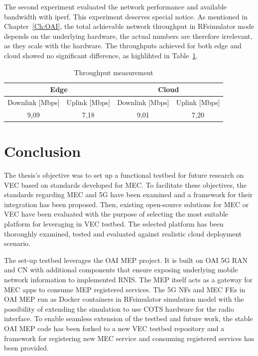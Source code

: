 \documentclass[12pt,a4paper,twoside]{report}
\begin{document}
The second experiment evaluated the network performance and available bandwidth with iperf. This experiment deserves special notice. As mentioned in Chapter~\ref{Ch:OAI}, the total achievable network throughput in RFsimulator mode depends on the underlying hardware, the actual numbers are therefore irrelevant, as they scale with the hardware. The throughputs achieved for both edge and cloud showed no significant difference, as highlihted in Table~\ref{T:throughput}.
\begin{table}[!ht]
    \centering
    \caption{Throughput measurement}
	\label{T:throughput}
    \begin{tabular}{|c|c|c|c|}
    \hline
        \multicolumn{2}{|c|}{Edge} & \multicolumn{2}{c|}{Cloud} \\ \hline
        Downlink [Mbps] & Uplink [Mbps] & Downlink [Mbps] & Uplink [Mbps] \\ \hline
        9,09 & 7,18 & 9,01 & 7,20 \\ \hline
    \end{tabular}
\end{table}
\chapter{Conclusion}
The thesis’s objective was to set up a functional testbed for future research on VEC based on standards developed for MEC. To facilitate these objectives, the standards regarding MEC and 5G have been examined and a framework for their integration has been proposed. Then, existing open-source solutions for MEC or VEC have been evaluated with the purpose of selecting the most suitable platform for leveraging in VEC testbed. The selected platform has been thoroughly examined, tested and evaluated against realistic cloud deployment scenario. 

The set-up testbed leverages the OAI MEP project. It is built on OAI 5G RAN and CN with additional components that ensure exposing underlying mobile network information to implemented RNIS. The MEP itself acts as a gateway for MEC apps to consume MEP registered services. The 5G NFs and MEC FEs in OAI MEP run as Docker containers in RFsimulator simulation model with the possibility of extending the simulation to use COTS hardware for the radio interface. To enable seamless extension of the testbed and future work, the stable OAI MEP code has been forked to a new VEC testbed repository and a framework for registering new MEC service and consuming registered services has been provided. 
\end{document}
